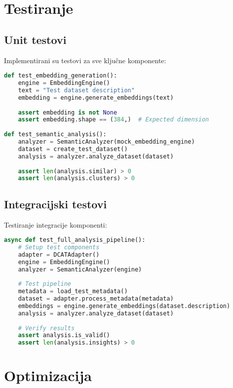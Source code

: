 \section{Testiranje}
\label{sec:testing}

\subsection{Unit testovi}
Implementirani su testovi za sve ključne komponente:

\begin{lstlisting}[language=Python, caption=Primjer unit testa]
def test_embedding_generation():
    engine = EmbeddingEngine()
    text = "Test dataset description"
    embedding = engine.generate_embeddings(text)
    
    assert embedding is not None
    assert embedding.shape == (384,)  # Expected dimension
    
def test_semantic_analysis():
    analyzer = SemanticAnalyzer(mock_embedding_engine)
    dataset = create_test_dataset()
    analysis = analyzer.analyze_dataset(dataset)
    
    assert len(analysis.similar) > 0
    assert len(analysis.clusters) > 0
\end{lstlisting}

\subsection{Integracijski testovi}
Testiranje integracije komponenti:

\begin{lstlisting}[language=Python, caption=Primjer integracijskog testa]
async def test_full_analysis_pipeline():
    # Setup test components
    adapter = DCATAdapter()
    engine = EmbeddingEngine()
    analyzer = SemanticAnalyzer(engine)
    
    # Test pipeline
    metadata = load_test_metadata()
    dataset = adapter.process_metadata(metadata)
    embeddings = engine.generate_embeddings(dataset.description)
    analysis = analyzer.analyze_dataset(dataset)
    
    # Verify results
    assert analysis.is_valid()
    assert len(analysis.insights) > 0
\end{lstlisting}

\section{Optimizacija}
\label{sec:optimization}


